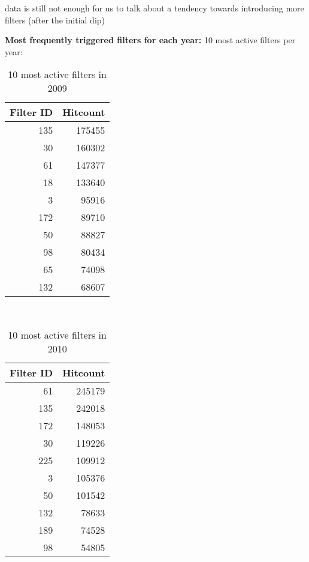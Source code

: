\documentclass{sigchi}
\begin{document}
data is still not enough for us to talk about a tendency towards introducing more filters (after the initial dip)


\textbf{Most frequently triggered filters for each year:}
10 most active filters per year:
\begin{table}
  \centering
  \begin{tabular}{r r }
    Filter ID & Hitcount \\  
    \hline
    135 & 175455 \\
    30 & 160302 \\
    61 & 147377 \\
    18 & 133640 \\
    3 & 95916 \\
    172 & 89710 \\
    50 & 88827 \\
    98 & 80434 \\
    65 & 74098 \\
    132 & 68607 \\
  \end{tabular}
  \caption{10 most active filters in 2009}~\label{tab:most-active-2009}
\end{table}

\begin{table}
  \centering
  \begin{tabular}{r r }
    Filter ID & Hitcount \\  
    \hline
    61 & 245179 \\
    135 & 242018 \\
    172 & 148053 \\
    30 & 119226 \\
    225 & 109912 \\
    3 & 105376 \\
    50 & 101542 \\
    132 & 78633 \\
    189 & 74528 \\
    98 & 54805 \\
  \end{tabular}
  \caption{10 most active filters in 2010}~\label{tab:most-active-2010}
\end{table}
\end{document}

